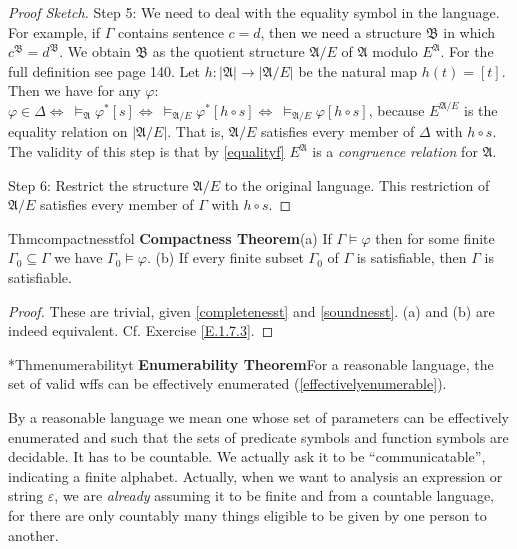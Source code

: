 \begin{proof}[Proof Sketch]
  Step 5: We need to deal with the equality symbol in the language. For example, if $\Gamma$ contains sentence $c=d$, then we need a structure $\mathfrak{B}$ in which $c^{\mathfrak{B}}=d^{\mathfrak{B}}.$ We obtain $\mathfrak{B}$ as the quotient structure $\mathfrak{A}/E$ of $\mathfrak{A}$ modulo $E^{\mathfrak{A}}$. For the full definition see page 140. Let $h:|\mathfrak{A}|\rightarrow|\mathfrak{A}/E|$ be the natural map $h(t)=[t]$. Then we have for any $\varphi$: $\varphi\in \Delta \Leftrightarrow\ \vDash_{\mathfrak{A}}\varphi^*[s]\Leftrightarrow\ \vDash_{\mathfrak{A}/E}\varphi^*[h\circ s]\Leftrightarrow\ \vDash_{\mathfrak{A}/E}\varphi[h\circ s]$, because $E^{\mathfrak{A}/E}$ is the equality relation on $|\mathfrak{A}/E|$. That is, $\mathfrak{A}/E$ satisfies every member of $\Delta$ with $h\circ s$. The validity of this step is that by \ref{equalityf} $E^{\mathfrak{A}}$ is a \textit{congruence relation} for $\mathfrak{A}$.

  Step 6: Restrict the structure $\mathfrak{A}/E$ to the original language. This restriction of $\mathfrak{A}/E$ satisfies every member of $\Gamma$ with $h\circ s$.
\end{proof}


\begin{reference}{Thm}{compactnesstfol}
  \textbf{Compactness Theorem}\quad(a) If $\Gamma\vDash \varphi$ then for some finite $\Gamma_0\subseteq \Gamma$ we have $\Gamma_0\vDash \varphi$. (b) If every finite subset $\Gamma_0$ of $\Gamma$ is satisfiable, then $\Gamma$ is satisfiable.
\end{reference}

\begin{proof}
  These are trivial, given \ref{completenesst} and \ref{soundnesst}. (a) and (b) are indeed equivalent. Cf. Exercise \ref{E.1.7.3}.
\end{proof}


\begin{reference}{*Thm}{enumerabilityt}
  \textbf{Enumerability Theorem}\quad For a reasonable language, the set of valid wffs can be effectively enumerated (\ref{effectivelyenumerable}).
\end{reference}


By a reasonable language we mean one whose set of parameters can be effectively enumerated and such that the sets of predicate symbols and function symbols are decidable. It has to be countable. We actually ask it to be ``communicatable'', indicating a finite alphabet. Actually, when we want to analysis an expression or string $\varepsilon$, we are \textit{already} assuming it to be finite and from a countable language, for there are only countably many things eligible to be given by one person to another.

